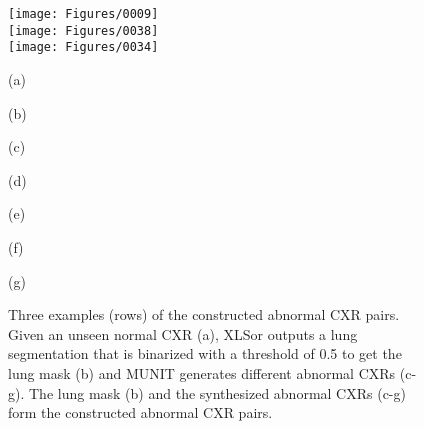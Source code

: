 \documentclass{midl} \usepackage{multirow}
\begin{document}
\begin{figure}[t!]
	\begin{minipage}[b]{1.0\linewidth}
		\centering
		\texttt{[image: Figures/0009]} \\
		\vspace{0.05cm}
		\texttt{[image: Figures/0038]} \\
		\vspace{0.05cm}
		\texttt{[image: Figures/0034]} \\
	\end{minipage}
\begin{minipage}[b]{0.136\linewidth}
		\centering
		\vspace{0.2cm}
		\centerline{(a)}\medskip
	\end{minipage}
	\begin{minipage}[b]{0.136\linewidth}
		\centering
		\vspace{0.2cm}
		\centerline{(b)}\medskip
	\end{minipage}
	\begin{minipage}[b]{0.136\linewidth}
		\centering
		\vspace{0.2cm}
		\centerline{(c)}\medskip
	\end{minipage}
	\begin{minipage}[b]{0.136\linewidth}
		\centering
		\vspace{0.2cm}
		\centerline{(d)}\medskip
	\end{minipage}
	\begin{minipage}[b]{0.136\linewidth}
		\centering
		\vspace{0.2cm}
		\centerline{(e)}\medskip
	\end{minipage}
	\begin{minipage}[b]{0.136\linewidth}
		\centering
		\vspace{0.2cm}
		\centerline{(f)}\medskip
	\end{minipage}
	\begin{minipage}[b]{0.136\linewidth}
		\centering
		\vspace{0.2cm}
		\centerline{(g)}\medskip
	\end{minipage}
	\caption{Three examples (rows) of the constructed abnormal CXR pairs. Given an unseen normal CXR (a), XLSor outputs a lung segmentation that is binarized with a threshold of 0.5 to get the lung mask (b) and MUNIT generates different abnormal CXRs (c-g). The lung mask (b) and the synthesized abnormal CXRs (c-g) form the constructed abnormal CXR pairs.}
	\label{fig:CXR_generation}
\end{figure}
\end{document}
